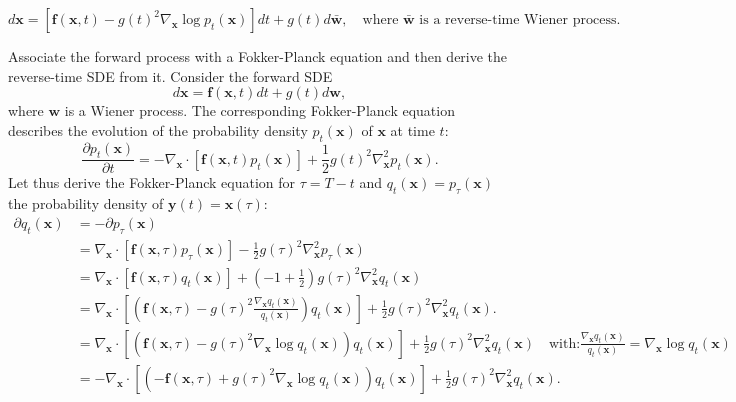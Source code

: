 \begin{equation}
d\mathbf{x}
=
\left[
\mathbf{f}(\mathbf{x},t)
-
g(t)^2
\nabla_{\mathbf{x}}
\log p_t(\mathbf{x})
\right]dt
+
g(t)d\bar{\mathbf{w}}, \quad {\scriptstyle \text{where $\bar{\mathbf{w}}$ is a reverse-time Wiener process.}}
\end{equation}

\begin{compactproof}[title={Proof}]
 Associate the forward process with a Fokker-Planck equation and then derive the reverse-time SDE from it.
 Consider the forward SDE
\begin{equation*}
d\mathbf{x}
=
\mathbf{f}(\mathbf{x},t)dt
+
g(t)d\mathbf{w},
\end{equation*}
where $\mathbf{w}$ is a Wiener process. The corresponding Fokker-Planck equation describes the evolution of the probability density $p_t(\mathbf{x})$ of $\mathbf{x}$ at time $t$:
\begin{equation*}
\frac{\partial p_t(\mathbf{x})}{\partial t}
=
-\nabla_{\mathbf{x}}\cdot\left[\mathbf{f}(\mathbf{x},t)p_t(\mathbf{x})\right]
+
\frac{1}{2}g(t)^2\nabla_{\mathbf{x}}^2p_t(\mathbf{x}).
\end{equation*}
Let thus derive the  Fokker-Planck equation for $\tau = T-t$ and $q_t(\mathbf{x})=p_{\tau}(\mathbf{x})$ the probability density of $\mathbf{y}(t)=\mathbf{x}(\tau)$:
\begin{align*}
    \partial q_t(\mathbf{x})
    &=
    -\partial p_{\tau}(\mathbf{x})\\
    &=
    \nabla_{\mathbf{x}}\cdot\left[\mathbf{f}(\mathbf{x},\tau)p_{\tau}(\mathbf{x})\right]
    -
    \frac{1}{2}g(\tau)^2\nabla_{\mathbf{x}}^2p_{\tau}(\mathbf{x})\\
    &=
    \nabla_{\mathbf{x}}\cdot\left[\mathbf{f}(\mathbf{x},\tau)q_t(\mathbf{x})\right]
    +
    \left(-1+\frac{1}{2}\right)g(\tau)^2\nabla_{\mathbf{x}}^2q_t(\mathbf{x})\\
    &=
    \nabla_{\mathbf{x}}\cdot\left[\left(\mathbf{f}(\mathbf{x},\tau)-g(\tau)^2\frac{\nabla_{\mathbf{x}}q_t(\mathbf{x})}{q_t(\mathbf{x})}\right)q_t(\mathbf{x})\right]
    +
    \frac{1}{2}g(\tau)^2\nabla_{\mathbf{x}}^2q_t(\mathbf{x}).  \\
    &=
    \nabla_{\mathbf{x}}\cdot\left[\left(\mathbf{f}(\mathbf{x},\tau)-g(\tau)^2\nabla_{\mathbf{x}}\log q_t(\mathbf{x})\right)q_t(\mathbf{x})\right]
    +
    \frac{1}{2}g(\tau)^2\nabla_{\mathbf{x}}^2q_t(\mathbf{x}) \quad 
    {\scriptstyle \text{with:} \frac{\nabla_{\mathbf{x}}q_t(\mathbf{x})}{q_t(\mathbf{x})} = \nabla_{\mathbf{x}}\log q_t(\mathbf{x}) } \\
    &= 
    - \nabla_{\mathbf{x}}\cdot\left[\left(-\mathbf{f}(\mathbf{x},\tau)+g(\tau)^2\nabla_{\mathbf{x}}\log q_t(\mathbf{x})\right)q_t(\mathbf{x})\right]
    +
    \frac{1}{2}g(\tau)^2\nabla_{\mathbf{x}}^2q_t(\mathbf{x}).
\end{align*}


\end{compactproof}
